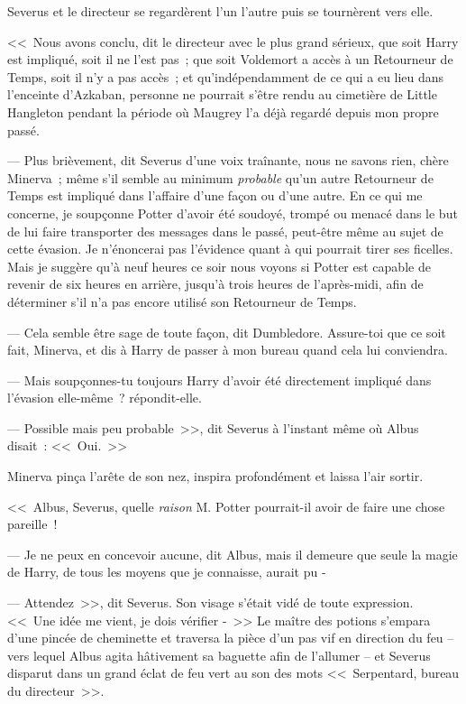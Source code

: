 Severus et le directeur se regardèrent l'un l'autre puis se tournèrent vers elle.

<<~Nous avons conclu, dit le directeur avec le plus grand sérieux, que soit Harry est impliqué, soit il ne l'est pas~; que soit Voldemort a accès à un Retourneur de Temps, soit il n'y a pas accès~; et qu'indépendamment de ce qui a eu lieu dans l'enceinte d'Azkaban, personne ne pourrait s'être rendu au cimetière de Little Hangleton pendant la période où Maugrey l'a déjà regardé depuis mon propre passé.

--- Plus brièvement, dit Severus d'une voix traînante, nous ne savons rien, chère Minerva~; même s'il semble au minimum \emph{probable} qu'un autre Retourneur de Temps est impliqué dans l'affaire d'une façon ou d'une autre. En ce qui me concerne, je soupçonne Potter d'avoir été soudoyé, trompé ou menacé dans le but de lui faire transporter des messages dans le passé, peut-être même au sujet de cette évasion. Je n'énoncerai pas l'évidence quant à qui pourrait tirer ses ficelles. Mais je suggère qu'à neuf heures ce soir nous voyons si Potter est capable de revenir de six heures en arrière, jusqu'à trois heures de l'après-midi, afin de déterminer s'il n'a pas encore utilisé son Retourneur de Temps.

--- Cela semble être sage de toute façon, dit Dumbledore. Assure-toi que ce soit fait, Minerva, et dis à Harry de passer à mon bureau quand cela lui conviendra.

--- Mais soupçonnes-tu toujours Harry d'avoir été directement impliqué dans l'évasion elle-même~? répondit-elle.

--- Possible mais peu probable~>>, dit Severus à l'instant même où Albus disait~: <<~Oui.~>>

Minerva pinça l'arête de son nez, inspira profondément et laissa l'air sortir.

<<~Albus, Severus, quelle \emph{raison} M. Potter pourrait-il avoir de faire une chose pareille~!

--- Je ne peux en concevoir aucune, dit Albus, mais il demeure que seule la magie de Harry, de tous les moyens que je connaisse, aurait pu -

--- Attendez~>>, dit Severus. Son visage s'était vidé de toute expression. <<~Une idée me vient, je dois vérifier -~>> Le maître des potions s'empara d'une pincée de cheminette et traversa la pièce d'un pas vif en direction du feu -- vers lequel Albus agita hâtivement sa baguette afin de l'allumer -- et Severus disparut dans un grand éclat de feu vert au son des mots <<~Serpentard, bureau du directeur~>>.

